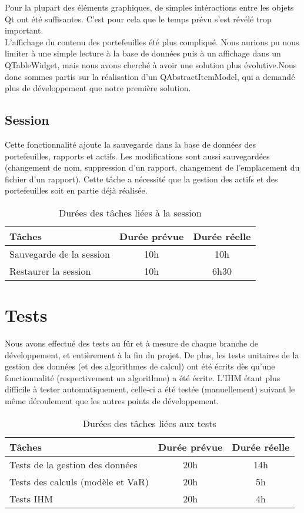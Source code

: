 \documentclass[a4paper]{report}
\begin{document}
Pour la plupart des éléments graphiques, de simples intéractions entre les objets Qt ont été suffisantes.
C'est pour cela que le temps prévu s'est révélé trop important.\\

L'affichage du contenu des portefeuilles été plus compliqué.
Nous aurions pu nous limiter à une simple lecture à la base de données puis à un affichage dans un QTableWidget, mais nous avons cherché à avoir une solution plus évolutive.Nous donc sommes partis sur la réalisation d'un QAbstractItemModel, qui a demandé plus de développement que notre première solution.

\section{Session}
Cette fonctionnalité ajoute la sauvegarde dans la base de données des portefeuilles, rapports et actifs.
Les modifications sont aussi sauvegardées (changement de nom, suppression d'un rapport, changement de l'emplacement du fichier d'un rapport).
Cette tâche a nécessité que la gestion des actifs et des portefeuilles soit en partie déjà réalisée.


\begin{table}[H]
\centering
  \begin{tabularx}{0.8\textwidth}{| X | c | c |}
    \hline
	Tâches & Durée prévue & Durée réelle \\
    \hline
    Sauvegarde de la session &  10h & 10h\\
    Restaurer la session &  10h & 6h30\\
    \hline
  \end{tabularx}
  \caption{Durées des tâches liées à la session}
\end{table}


\chapter{Tests}

Nous avons effectué des tests au fûr et à mesure de chaque branche de développement, et entièrement à la fin du projet.
De plus, les tests unitaires de la gestion des données (et des algorithmes de calcul) ont été écrits dès qu'une fonctionnalité (respectivement un algorithme) a été écrite.
L'IHM étant plus difficile à tester automatiquement, celle-ci a été testée (manuellement) suivant le même déroulement que les autres points de développement.


\begin{table}[H]
\centering
  \begin{tabularx}{0.8\textwidth}{| X | c | c |}
    \hline
	Tâches & Durée prévue & Durée réelle \\
    \hline
    Tests de la gestion des données & 20h & 14h\\
    Tests des calculs (modèle et VaR) & 20h & 5h\\
    Tests IHM & 20h & 4h\\
    \hline
  \end{tabularx}
  \caption{Durées des tâches liées aux tests}
\end{table}
\end{document}
